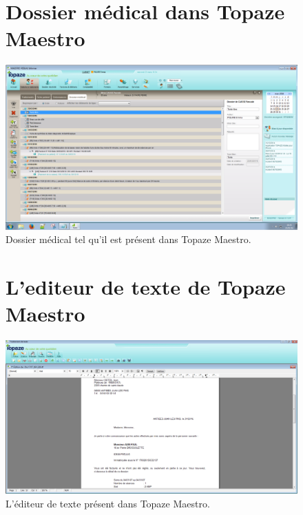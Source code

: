 \begin{appendices}

\begin{figure}[H]
\section*{Dossier médical dans Topaze Maestro}
  \centering
  \centerline{\includegraphics[width=18cm]{./img/medical_data_maestro.PNG}}
  \caption{\label{fig:dossier_medical} Dossier médical tel qu'il est présent dans Topaze Maestro.}
\end{figure}

\newpage
\begin{figure}[H]
\section*{L'editeur de texte de Topaze Maestro}
  \centering
  \centerline{\includegraphics[width=18cm]{./img/text_editor2}}
  \caption{\label{fig:editeur_texte} L'éditeur de texte présent dans Topaze Maestro.}
\end{figure}


\newpage
\begin{figure}[H]

\end{figure}
\end{appendices}
